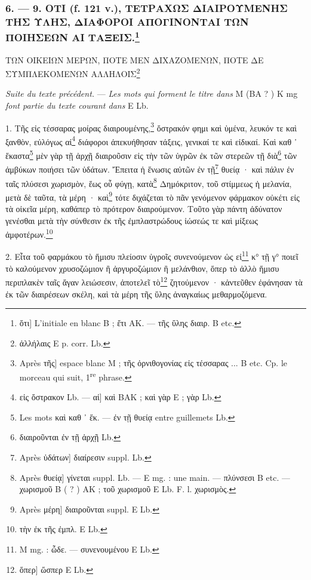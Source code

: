 \documentclass[a4paper, 11pt, oneside, polutonikogreek, french]{article}
\begin{document}
\bigskip
\centerline{\EightStarTaper}
\centerline{\EightStarTaper\EightStarTaper}
\bigskip

\subsubsection[6. --- 9. ΟΤΙ (f. 121 v.), ΤΕΤΡΑΧΩΣ ΔΙΑΙΡΟΥΜΕΝΗΣ ΤΗΣ ΥΛΗΣ, ΔΙΑΦΟΡΟΙ ΑΠΟΓΙΝΟΝΤΑΙ ΤΩΝ ΠΟΙΗΣΕΩΝ ΑΙ ΤΑΞΕΙΣ.]{6. --- 9. ΟΤΙ (f. 121 v.), ΤΕΤΡΑΧΩΣ ΔΙΑΙΡΟΥΜΕΝΗΣ ΤΗΣ ΥΛΗΣ, ΔΙΑΦΟΡΟΙ ΑΠΟΓΙΝΟΝΤΑΙ ΤΩΝ ΠΟΙΗΣΕΩΝ ΑΙ ΤΑΞΕΙΣ.\footnote{ὅτι] L'initiale en blanc B ; ἔτι AK. --- τῆς ὕλης διαιρ. B etc.}}

ΤΩΝ ΟΙΚΕΙΩΝ ΜΕΡΩΝ, ΠΟΤΕ ΜΕΝ ΔΙΧΑΖΟΜΕΝΩΝ, ΠΟΤΕ ΔΕ ΣΥΜΠΛΕΚΟΜΕΝΩΝ ΑΛΛΗΛΟΙΣ\footnote{ἀλλήλαις E p. corr. Lb.}

\emph{Suite du texte précédent.} --- \emph{Les mots qui forment le titre dans} M (BA ? ) K mg \emph{font partie du texte courant dans} E Lb.

\bigskip

1. Τῆς      εἰς τέσσαρας μοίρας διαιρουμένης,\footnote{Après τῆς] espace blanc M ; τῆς ὀρνιθογονίας εἰς τέσσαρας ... B etc. Cp. le morceau qui suit, 1\textsuperscript{re} phrase.} ὄστρακόν φημι καὶ ὑμένα, λευκόν τε καὶ ξανθὸν, εὐλόγως αἱ\footnote{εἰς ὄστρακον Lb. --- αἰ] καὶ BAK ; καὶ γὰρ E ; γὰρ Lb.} διάφοροι ἀπεκυήθησαν τάξεις, γενικαί τε καὶ εἰδικαί. Καὶ καθ ᾽ ἕκαστα\footnote{Les mots καὶ καθ ᾽ ἕκ. --- ἐν τῇ θυείᾳ entre guillemets Lb.} μὲν γὰρ τῇ ἀρχῇ διαιροῦσιν εἰς τὴν τῶν ὑγρῶν ἐκ τῶν στερεῶν τῇ διὰ\footnote{διαιροῦνται ἐν τῇ ἀρχῇ Lb.} τῶν ἀμβύκων ποιήσει τῶν ὑδάτων. Ἔπειτα ἡ ἕνωσις αὐτῶν ἐν τῇ\footnote{Après ὑδάτων] διαίρεσιν suppl. Lb.} θυείᾳ · καὶ πάλιν ἐν ταῖς πλύσεσι χωρισμὸν, ἕως οὗ φύγῃ, κατὰ\footnote{Après θυείᾳ] γίνεται suppl. Lb. --- E mg. : une main. --- πλύνσεσι B etc. --- χωρισμοῦ B ( ? ) AK ; τοῦ χωρισμοῦ E Lb. F. l. χωρισμὸς.} Δημόκριτον, τοῦ στίμμεως ἡ μελανία, μετὰ δὲ ταῦτα, τὰ μέρη · καὶ\footnote{Après μέρη] διαιροῦνται suppl. E Lb.} τότε διχάζεται τὸ πᾶν γενόμενον φάρμακον οὐκέτι εἰς τὰ οἰκεῖα μέρη, καθάπερ τὸ πρότερον διαιρούμενον. Τοῦτο γὰρ πάντη ἀδύνατον γενέσθαι μετὰ τὴν σύνθεσιν ἐκ τῆς ἐμπλαστρώδους ἰώσεώς τε καὶ μίξεως ἀμφοτέρων.\footnote{τὴν ἐκ τῆς ἐμπλ. E Lb.}

2. Εἶτα τοῦ φαρμάκου τὸ ἥμισυ πλείοσιν ὑγροῖς συνενούμενον ὡς εἰ\footnote{M mg. : ὧδε. --- συνενουμένου E Lb.} κ° τῇ γ° ποιεῖ τὸ καλούμενον χρυσοζώμιον ἢ ἀργυροζώμιον ἢ μελάνθιον, ὅπερ τὸ ἀλλὸ ἥμισυ περιπλακὲν ταῖς ἄγαν λειώσεσιν, ἀποτελεῖ τὸ\footnote{ὅπερ] ὥσπερ E Lb.} ζητούμενον · κἀντεῦθεν ἐφάνησαν τὰ ἐκ τῶν διαιρέσεων σκέλη, καὶ τὰ μέρη τῆς ὕλης ἀναγκαίως μεθαρμοζόμενα.
\end{document}
